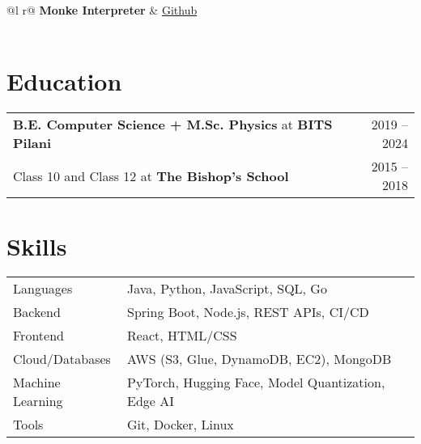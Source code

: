 \documentclass[a4paper,12pt]{article}
\begin{document}
\begin{tabularx}{\linewidth}{ @{}l r@{} }
\textbf{Monke Interpreter} & \hfill \href{https://github.com/nameetrajore/monke-interpreter}{Github} \\[3.75pt]
 \\
\end{tabularx}
\vspace{-2mm}

\section{Education}
\begin{tabularx}{\linewidth}{@{}X r@{}}
\textbf{B.E. Computer Science + M.Sc. Physics} at \textbf{BITS Pilani} & 2019 -- 2024 \\

Class 10 and Class 12 at \textbf{The Bishop's School} & 2015 -- 2018 \\
\end{tabularx}
\vspace{-2mm}



\section{Skills}
\begin{tabularx}{\linewidth}{@{}l X@{}}
Languages & Java, Python, JavaScript, SQL, Go \\
Backend  & Spring Boot, Node.js, REST APIs, CI/CD \\
Frontend & React, HTML/CSS \\
Cloud/Databases & AWS (S3, Glue, DynamoDB, EC2), MongoDB \\
Machine Learning & PyTorch, Hugging Face, Model Quantization, Edge AI \\
Tools & Git, Docker, Linux \\
\end{tabularx}

\vfill
\end{document}
